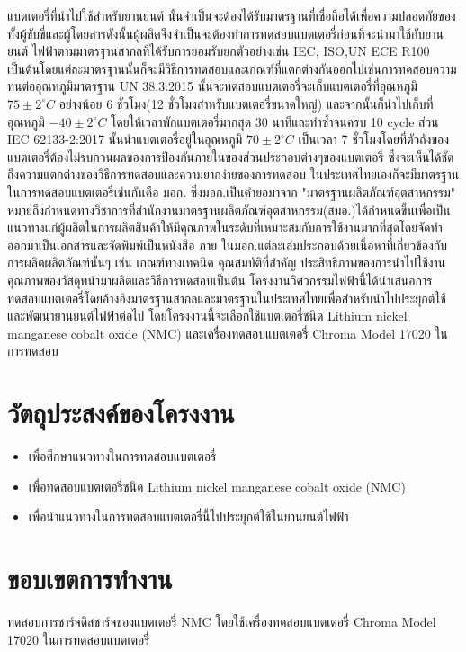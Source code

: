 	แบตเตอรี่ที่นำไปใช้สำหรับยานยนต์ นั้นจำเป็นจะต้องได้รับมาตรฐานที่เชื่อถือได้เพื่อความปลอดภัยของทั้งผู้ขับขี่และผู้โดยสารดังนั้นผู้ผลิตจึงจำเป็นจะต้องทำการทดสอบแบตเตอรี่ก่อนที่จะนำมาใช้กับยานยนต์ ไฟฟ้าตามมาตรฐานสากลที่ได้รับการยอมรับยกตัวอย่างเช่น IEC, ISO,UN ECE R100 เป็นต้นโดยแต่ละมาตรฐานนั้นก็จะมีวิธีการทดสอบและเกณฑ์ที่แตกต่างกันออกไปเช่นการทดสอบความทนต่ออุณหภูมิมาตรฐาน UN 38.3:2015 นั้นจะทดสอบแบตเตอรี่จะเก็บแบตเตอรี่ที่อุณหภูมิ $75\pm 2^{\circ}C$  อย่างน้อย 6 ชั่วโมง(12 ชั่วโมงสำหรับแบตเตอรี่ขนาดใหญ่) และจากนั้นก็นำไปเก็บที่อุณหภูมิ $-40\pm 2^{\circ}C$ โดยให้เวลาพักแบตเตอรี่มากสุด 30 นาทีและทำซ้ำจนครบ 10 cycle ส่วน IEC 62133-2:2017 นั้นนำแบตเตอรี่อยู่ในอุณหภูมิ $70\pm 2^{\circ}C$ เป็นเวลา 7 ชั่วโมงโดยที่ตัวถังของแบตเตอรี่ต้องไม่รบกวนผลของการป้องกันภายในของส่วนประกอบต่างๆของแบตเตอรี่\cite{ruiz2018review} ซึ่งจะเห็นได้ชัดถึงความแตกต่างของวิธีการทดสอบและความยากง่ายของการทดสอบ ในประเทศไทยเองก็จะมีมาตรฐานในการทดสอบแบตเตอรี่เช่นกันคือ มอก. ซึ่งมอก.เป็นคํายอมาจาก "มาตรฐานผลิตภัณฑ์อุตสาหกรรม" หมายถึงกําหนดทางวิชาการที่สำนักงานมาตรฐานผลิตภัณฑ์อุตสาหกรรม(สมอ.)ได้กําหนดขึ้นเพื่อเป็นแนวทางแก่ผู้ผลิตในการผลิตสินค้าให้มีคุณภาพในระดับที่เหมาะสมกับการใช้งานมากที่สุดโดยจัดทำออกมาเป็นเอกสารและจัดพิมพ์เป็นหนังสือ ภาย ในมอก.แต่ละเล่มประกอบด้วยเนื้อหาที่เกี่ยวข้องกับการผลิตผลิตภัณฑ์นั้นๆ เช่น เกณฑ์ทางเทคนิค คุณสมบัติที่สําคัญ ประสิทธิภาพของการนําไปใช้งาน คุณภาพของวัสดุทนํามาผลิตและวิธีการทดสอบเป็นต้น
\newline 
\hspace*{2cm}
	โครงงานวิศวกรรมไฟฟ้านี้ได้นำเสนอการทดสอบแบตเตอรี่โดยอ้างอิงมาตรฐานสากลและมาตรฐานในประเทศไทยเพื่อสำหรับนำไปประยุกต์ใช้และพัฒนายานยนต์ไฟฟ้าต่อไป โดยโครงงานนี้จะเลือกใช้แบตเตอรี่ชนิด Lithium nickel manganese cobalt oxide (NMC) และเครื่องทดสอบแบตเตอรี่ Chroma Model 17020 ในการทดสอบ
\section{วัตถุประสงค์ของโครงงาน}
\begin{itemize}
  \item เพื่อศึกษาแนวทางในการทดสอบแบตเตอรี่
  \item เพื่อทดสอบแบตเตอรี่ชนิด Lithium nickel manganese cobalt oxide (NMC)
  \item เพื่อนำแนวทางในการทดสอบแบตเตอรี่นี้ไปประยุกต์ใช้ในยานยนต์ไฟฟ้า
\end{itemize}
\section{ขอบเขตการทำงาน}
ทดสอบการชาร์จดิสชาร์จของแบตเตอรี่ NMC โดยใช้เครื่องทดสอบแบตเตอรี่ Chroma Model 17020 ในการทดสอบแบตเตอรี่

